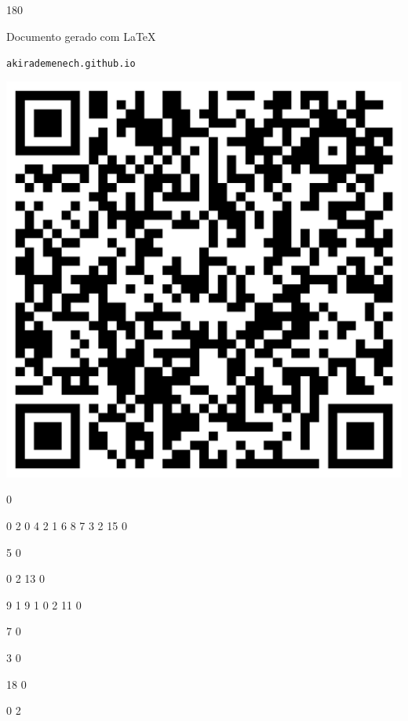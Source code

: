 \documentclass[12pt]{article}
\begin{document}
	\begin{turn}{180}	
		\begin{minipage}{\textwidth}		  
		  Documento gerado com \LaTeX			
		  
		  \texttt{akirademenech.github.io}

		  \includegraphics[height=0.3\textheight]{2e-2.pdf}

		\end{minipage}	
	\end{turn}  
		  
		\vfill  
		  
{
	0	%

	0	%
	2	%
	0	%
	4	%
	2	%
	1	%
	6	%
	8	%
	7	%
	3	%
	2	%
	15	%
	0	%

	5	%
	0	%

	0	%
	2	%
	13	%
	0	%

	9	%
	1	%
	9	%
	1	%
	0	%
	2	%
	11	%
	0	%

	7	%
	0	%

	3	%
	0	%

	18	%
	0	%

	0	%
	2	%
}	  
		    	
\end{document}
